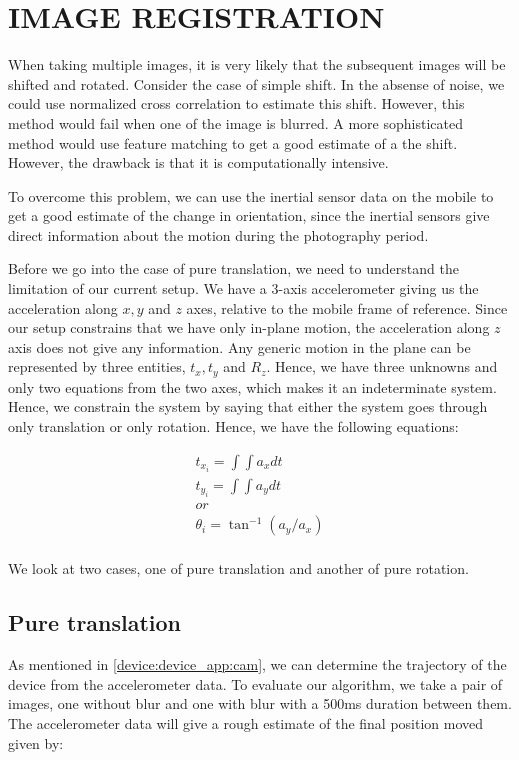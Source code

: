 \documentclass[BTech]{iitmdiss}
\begin{document}
\chapter{IMAGE REGISTRATION}
\label{chap:image_registration}
When taking multiple images, it is very likely that the subsequent 
images will be shifted and rotated. Consider the case of simple shift. 
In the absense of noise, we could use normalized cross correlation
to estimate this shift. However, this method would fail when one of the 
image is blurred. A more sophisticated method would use feature matching
to get a good estimate of a the shift. However, the drawback is that it
is computationally intensive.

To overcome this problem, we can use the inertial sensor data on the 
mobile to get a good estimate of the change in orientation, since the 
inertial sensors give direct information about the motion during the 
photography period. 

Before we go into the case of pure translation, we need to understand 
the limitation of our current setup. We have a 3-axis accelerometer 
giving us the acceleration along ${x, y}$ and $z$ axes, relative to
the mobile frame of reference. Since our setup constrains that we have
only in-plane motion, the acceleration along $z$ axis does not give 
any information. Any generic motion in the plane can be represented by
three entities, ${t_x, t_y}$ and $R_z$. Hence, we have three unknowns
and only two equations from the two axes, which makes it an 
indeterminate system. Hence, we constrain the system by saying that
either the system goes through only translation or only rotation. Hence,
we have the following equations:

\begin{align*}
t_{x_i}=\int{\int{a_x}}dt\\
t_{y_i}=\int{\int{a_y}}dt\\
or\\
{\theta}_i=\tan^{-1}({a_y}/{a_x})\\
\end{align*}

We look at two cases, one of pure translation and another of pure 
rotation.
\section{Pure translation}
\label{image_registration:pure_translation}
As mentioned in \ref{device:device_app:cam}, we can determine the 
trajectory of the device from the accelerometer data. To evaluate our
algorithm, we take a pair of images, one without blur and one with blur
with a 500ms duration between them. The accelerometer data will give a
rough estimate of the final position moved given by:
\end{document}
